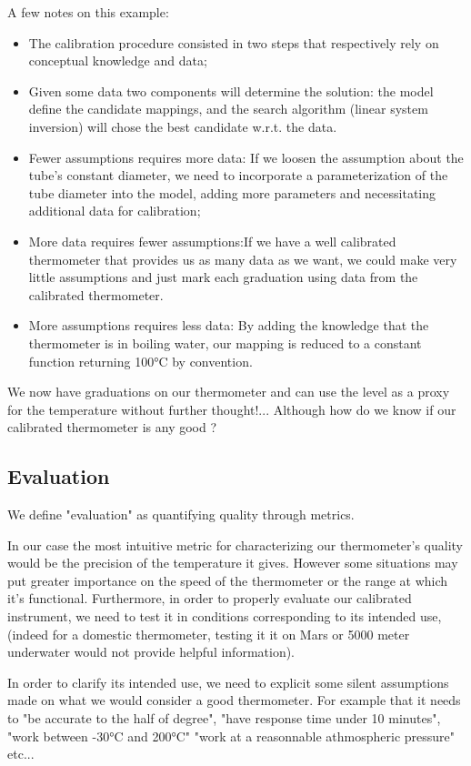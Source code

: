 \begin{bibunit}
A few notes on this example:
\begin{itemize}
\item The calibration procedure consisted in two steps that respectively rely on conceptual knowledge and data;
\item Given some data two components will determine the solution: the model define the candidate mappings, and the search algorithm (linear system inversion) will chose the best candidate w.r.t. the data.
\item Fewer assumptions requires more data: If we loosen the assumption about the tube's constant diameter, we need to incorporate a parameterization of the tube diameter into the model, adding more parameters and necessitating additional data for calibration;
\item More data requires fewer assumptions:If we have a well calibrated thermometer that provides us as many data as we want, we could make very little assumptions and just mark each graduation using data from the calibrated thermometer.
\item More assumptions requires less data: By adding the knowledge that the thermometer is in boiling water, our mapping is reduced to a constant function returning 100°C by convention.
  \end{itemize}

We now have graduations on our thermometer and can use the level as a proxy for the temperature without further thought!... Although how do we know if our calibrated thermometer is any good ? 


\subsection{Evaluation}

We define "evaluation" as quantifying quality through metrics.

In our case the most intuitive metric for characterizing our thermometer's quality would be the precision of the temperature it gives.
However some situations may put greater importance on the speed of the thermometer or the range at which it's functional.
  Furthermore, in order to properly evaluate our calibrated instrument, we need to test it in conditions corresponding to its intended use, (indeed for a domestic thermometer, testing it it on Mars or 5000 meter underwater would not provide helpful information).

 In order to clarify its intended use, we need to explicit some silent assumptions made on what we would consider a good thermometer.
  For example that it needs to "be accurate to the half of degree", "have response time under 10 minutes", "work between -30°C and 200°C" "work at a reasonnable athmospheric pressure" etc...


\end{bibunit}
